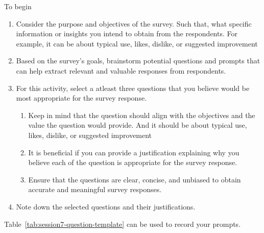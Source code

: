 To begin
\begin{enumerate}
    \item Consider the purpose and objectives of the survey. Such that, what specific information or insights you intend to obtain from the respondents. 
    For example, it can be about typical use, likes, dislike, or suggested improvement
    \item Based on the survey's goals, brainstorm potential questions and prompts that can help extract relevant and valuable responses from respondents.
    \item For this activity, select a atleast three questions that you believe would be most appropriate for the survey response.
    \begin{enumerate}
        \item Keep in mind that the question should align with the objectives and the value the question would provide. And it should be about typical use, likes, dislike, or suggested improvement
        \item It is beneficial if you can provide a justification explaining why you believe each of the question is appropriate for the survey response.
        \item Ensure that the questions are clear, concise, and unbiased to obtain accurate and meaningful survey responses.
    \end{enumerate}
    \item Note down the selected questions and their justifications.
\end{enumerate}

Table~\ref{tab:session7-question-template} can be used to record your prompts.

